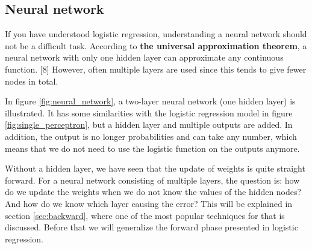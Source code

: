 \subsection{Neural network} \label{sec:neural_network}
If you have understood logistic regression, understanding a neural network should not be a difficult task. According to  \textbf{the universal approximation theorem}, a neural network with only one hidden layer can approximate any continuous function. [8] However, often multiple layers are used since this tends to give fewer nodes in total. 

In figure \eqref{fig:neural_network}, a two-layer neural network (one hidden layer) is illustrated. It has some similarities with the logistic regression model in figure \eqref{fig:single_perceptron}, but a hidden layer and multiple outputs are added. In addition, the output is no longer probabilities and can take any number, which means that we do not need to use the logistic function on the outputs anymore.



Without a hidden layer, we have seen that the update of weights is quite straight forward. For a neural network consisting of multiple layers, the question is: how do we update the weights when we do not know the values of the hidden nodes? And how do we know which layer causing the error? This will be explained in section \ref{sec:backward}, where one of the most popular techniques for that is discussed. Before that we will generalize the forward phase presented in logistic regression.

